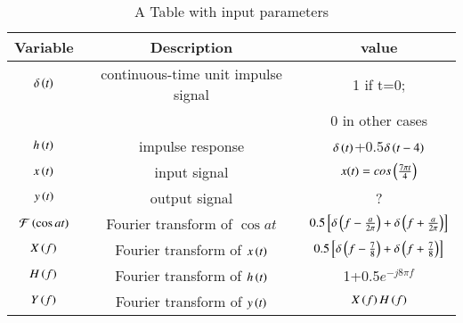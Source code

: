 \begin{table}[ht]
 \centering
  \begin{tabular}{|c|c|c|}
    \hline
    \textbf{Variable} & \textbf{Description} & \textbf{value}\\
    \hline
    $\delta\left(t\right)$ & continuous-time unit impulse signal & 1 if t=0;\\ & &  0 in other cases\\
   \hline
    $h\left(t\right)$ & impulse response & $\delta\left(t\right)$+0.5$ \delta\left(t-4\right)$ \\
    \hline
    $x\left(t\right)$ & input signal  & $x(t)=cos\left(\frac{7\pi t}{4}\right)$ \\
    \hline
        $y\left(t\right)$ & output signal  & ? \\
    \hline
     $\mathcal{F}\left(\cos{a t}\right)$ & Fourier transform of $\cos{a t}$ & $0.5{}\left[\delta \left(f-\frac{a}{2\pi}\right)+\delta \left(f+\frac{a}{2\pi}\right)\right]$\\
    \hline
    $X\left(f\right)$ & Fourier transform of $x\left(t\right)$ & $0.5{}\left[\delta \left(f-\frac{7}{8}\right)+\delta \left(f+\frac{7}{8}\right)\right]$\\
    \hline
        $H\left(f\right)$ & Fourier transform of $h\left(t\right)$ & 1+0.5$e^{-j8\pi f}$\\
    \hline
     $Y\left(f\right)$ & Fourier transform of $y\left(t\right)$ & $X\left(f\right)H\left(f\right)$\\
    \hline
    \end{tabular}
  \caption{A Table with input parameters}
  \label{tab:gate2023in36}
\end{table}
